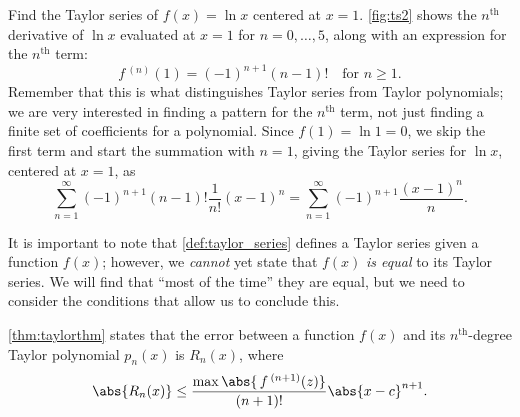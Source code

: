 \begin{example}[The Taylor series of $f(x)=\ln x$ at $x=1$]\label{ex_ts2}
Find the Taylor series of $f(x) = \ln x$ centered at $x=1$.
\solution
\autoref{fig:ts2} shows the $n^\text{th}$ derivative of $\ln x$ evaluated at $x=1$ for $n=0,\dotsc,5$, along with an expression for the $n^\text{th}$ term:
\[f\,^{(n)}(1) = (-1)^{n+1}(n-1)!\quad \text{for $n\geq 1$.}\]
Remember that this is what distinguishes Taylor series from Taylor polynomials; we are very interested in finding a pattern for the $n^\text{th}$ term, not just finding a finite set of coefficients for a polynomial.
Since $f(1) = \ln 1 = 0$, we skip the first term and start the summation with $n=1$, giving the Taylor series for $\ln x$, centered at $x=1$, as 
\[\sum_{n=1}^\infty (-1)^{n+1}(n-1)!\frac{1}{n!}(x-1)^n = \sum_{n=1}^\infty (-1)^{n+1}\frac{(x-1)^n}{n}.\]
\end{example}

It is important to note that \autoref{def:taylor_series} defines a Taylor series given a function $f(x)$; however, we \emph{cannot} yet state that $f(x)$ \emph{is equal} to its Taylor series. We will find that ``most of the time'' they are equal, but we need to consider the conditions that allow us to conclude this.

\autoref{thm:taylorthm} states that the error between a function $f(x)$ and its $n^\text{th}$-degree Taylor polynomial $p_n(x)$ is $R_n(x)$, where
\[\abs{R_n(x)}\leq \frac{\max\abs{\,f\,^{(n+1)}(z)}}{(n+1)!}\abs{x-c}^{n+1}.\]

